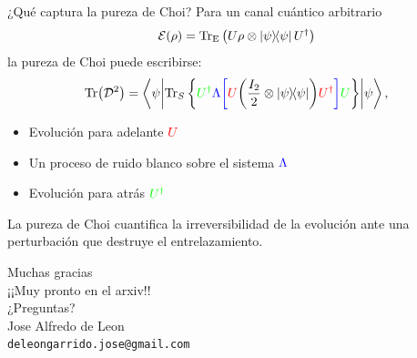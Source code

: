 \documentclass[10pt,handout]{beamer}
\begin{document}
\begin{frame}{¿Qué captura la pureza de Choi?}
Para un canal cuántico arbitrario 
\[
\mathcal{E}(\rho) 
=
\Tr_\mathrm{E}
\qty(
U 
\rho \otimes \dyad{\psi}
U^\dagger
)
\]
la pureza de Choi puede escribirse:
\[
\Tr(\mathcal{D}^2) = 
\ev**{
\Tr_S\qty{
{\color{green} U^\dagger 
{\color{blue}\Lambda \qty[
{\color{red} U 
{\color{black} \left( \frac{I_2}{2} \otimes \dyad{\psi} \right)} 
U^\dagger}
]}
U}
}
}{\psi},
\]
\begin{itemize}
\item Evolución para adelante $\color{red} U$ 
\item Un proceso de ruido blanco sobre el sistema $\color{blue}\Lambda$
\item Evolución para atrás $\color{green}U^\dagger$
\end{itemize}
\pause
\alert{La pureza de Choi cuantifica la irreversibilidad de la evolución ante
una perturbación que destruye el entrelazamiento.}
\end{frame}

\begin{frame}[standout]
  \centering
  Muchas gracias\\
  \vspace{1cm}
  ¡¡Muy pronto en el arxiv!!\\
  \vspace{1cm}
  ¿Preguntas?\\
  \vspace{1cm}
  \small Jose Alfredo de Leon\\
  \texttt{deleongarrido.jose@gmail.com}\\
\end{frame}

\end{document}

